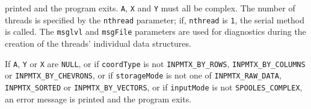 \begin{enumerate}
printed and the program exits.
{\tt A}, {\tt X} and {\tt Y} must all be complex.
The number of threads is specified by the {\tt nthread} parameter;
if, {\tt nthread} is {\tt 1}, the serial method is called.
The {\tt msglvl} and {\tt msgFile} parameters are used for
diagnostics during the creation of the threads' individual data
structures.
\par {}
If {\tt A}, {\tt Y} or {\tt X} are {\tt NULL},
or if {\tt coordType} is not {\tt INPMTX\_BY\_ROWS},
{\tt INPMTX\_BY\_COLUMNS} or {\tt INPMTX\_BY\_CHEVRONS},
or if {\tt storageMode} is not one of {\tt INPMTX\_RAW\_DATA},
{\tt INPMTX\_SORTED} or {\tt INPMTX\_BY\_VECTORS},
or if {\tt inputMode} is not {\tt SPOOLES\_COMPLEX},
an error message is printed and the program exits.
\end{enumerate}
\par
